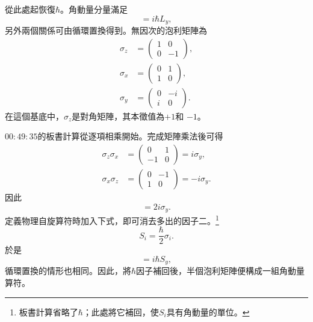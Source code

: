 從此處起恢復\(\hbar\)。角動量分量滿足
\begin{equation}
[L_{z},L_{x}]=i\hbar L_{y},
\end{equation}
另外兩個關係可由循環置換得到。無因次的泡利矩陣為
\begin{equation}
\begin{aligned}
\sigma_{z}&=
\begin{pmatrix}
1&0\\
0&-1
\end{pmatrix},\\[0.4em]
\sigma_{x}&=
\begin{pmatrix}
0&1\\
1&0
\end{pmatrix},\\[0.4em]
\sigma_{y}&=
\begin{pmatrix}
0&-i\\
i&0
\end{pmatrix}.
\end{aligned}
\end{equation}
在這個基底中，\(\sigma_{z}\)是對角矩陣，其本徵值為\(+1\)和
\(-1\)。

\begin{classroomqa}
\end{classroomqa}

\(00{:}49{:}35\)的板書計算從逐項相乘開始。完成矩陣乘法後可得
\begin{align}
\sigma_{z}\sigma_{x}
&=
\begin{pmatrix}
0&1\\
-1&0
\end{pmatrix}
=i\sigma_{y},\\
\sigma_{x}\sigma_{z}
&=
\begin{pmatrix}
0&-1\\
1&0
\end{pmatrix}
=-i\sigma_{y}.
\end{align}
因此
\begin{equation}
[\sigma_{z},\sigma_{x}]=2i\sigma_{y}.
\end{equation}
定義物理自旋算符時加入下式，即可消去多出的因子二。\footnote{板書計算省略了\(\hbar\)；此處將它補回，使\(S_i\)具有角動量的單位。}
\begin{equation}
S_{i}=\frac{\hbar}{2}\sigma_{i}.
\end{equation}
於是
\begin{equation}
[S_{z},S_{x}]=i\hbar S_{y},
\end{equation}
循環置換的情形也相同。因此，將\(\hbar\)因子補回後，半個泡利矩陣便構成一組角動量算符。

